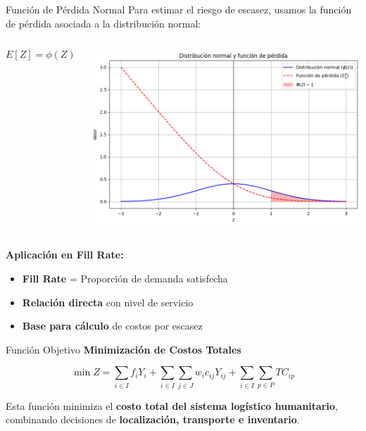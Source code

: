 \documentclass[
  ignorenonframetext,
]{beamer}
\providecommand{\tightlist}{%
  \setlength{\itemsep}{0pt}\setlength{\parskip}{0pt}}
\begin{document}
\begin{frame}{Función de Pérdida Normal}
\label{funciuxf3n-de-puxe9rdida-normal}
Para estimar el riesgo de escasez, usamos la función de pérdida asociada
a la distribución normal:

\begin{columns}[T]
\begin{column}{0.4\linewidth}
\[E[Z] = \phi(Z) - Z(1 - \Phi(Z))\]
\end{column}

\begin{column}{0.6\linewidth}
\includegraphics[width=1\linewidth,height=\textheight,keepaspectratio]{funcion_perdida.png}
\end{column}
\end{columns}

\textbf{Aplicación en Fill Rate:}

\begin{itemize}
\tightlist
\item
  \textbf{Fill Rate} = Proporción de demanda satisfecha
\item
  \textbf{Relación directa} con nivel de servicio
\item
  \textbf{Base para cálculo} de costos por escasez
\end{itemize}
\end{frame}

\begin{frame}{Función Objetivo}
\label{funciuxf3n-objetivo}
\textbf{Minimización de Costos Totales}

\[
\min Z =
\sum_{i \in I} f_i Y_i +
\sum_{i \in I} \sum_{j \in J} w_i c_{ij} Y_{ij} +
\sum_{i \in I} \sum_{p \in P} TC_{ip}
\]

Esta función minimiza el \textbf{costo total del sistema logístico
humanitario}, combinando decisiones de \textbf{localización, transporte
e inventario}.
\end{frame}
\end{document}

